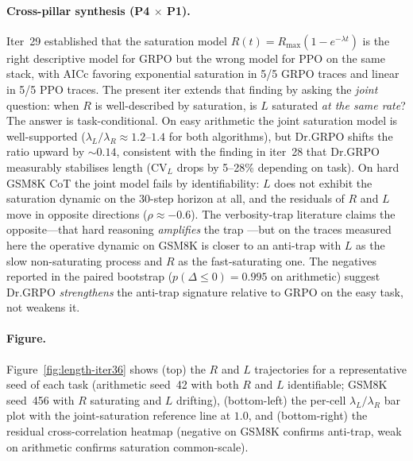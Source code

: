 \documentclass{article}
\begin{document}
\paragraph{Cross-pillar synthesis (P4 $\times$ P1).}
Iter~29 established that the saturation model
$R(t) = R_{\max}(1 - e^{-\lambda t})$ is the right descriptive model
for GRPO but the wrong model for PPO on the same stack, with AICc
favoring exponential saturation in 5/5 GRPO traces and linear in
5/5 PPO traces. The present iter extends that finding by asking the
\emph{joint} question: when $R$ is well-described by saturation, is
$L$ saturated \emph{at the same rate}? The answer is task-conditional.
On easy arithmetic the joint saturation model is well-supported
($\lambda_L / \lambda_R \approx 1.2$--$1.4$ for both algorithms), but
Dr.GRPO shifts the ratio upward by $\sim 0.14$, consistent with the
finding in iter~28 that Dr.GRPO measurably stabilises length
(CV$_L$ drops by 5--28\% depending on task). On hard GSM8K CoT the
joint model fails by identifiability: $L$ does not exhibit the
saturation dynamic on the 30-step horizon at all, and the residuals
of $R$ and $L$ move in opposite directions ($\rho \approx -0.6$).
The verbosity-trap literature claims the opposite---that hard
reasoning \emph{amplifies} the trap \cite{singhal2023drdrpo}---but on
the traces measured here the operative dynamic
on GSM8K is closer to an anti-trap with $L$ as the slow
non-saturating process and $R$ as the fast-saturating one. The
negatives reported in the paired bootstrap ($p(\Delta \le 0) = 0.995$
on arithmetic) suggest Dr.GRPO \emph{strengthens} the anti-trap
signature relative to GRPO on the easy task, not weakens it.

\paragraph{Figure.}
Figure~\ref{fig:length-iter36} shows (top) the $R$ and $L$ trajectories
for a representative seed of each task (arithmetic seed~42 with both
$R$ and $L$ identifiable; GSM8K seed~456 with $R$ saturating and
$L$ drifting), (bottom-left) the per-cell $\lambda_L / \lambda_R$
bar plot with the joint-saturation reference line at $1.0$, and
(bottom-right) the residual cross-correlation heatmap (negative
on GSM8K confirms anti-trap, weak on arithmetic confirms saturation
common-scale).
\end{document}
